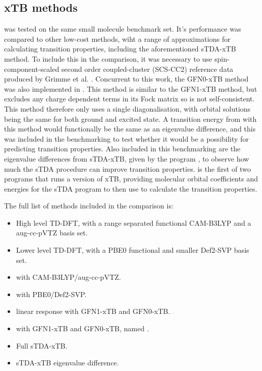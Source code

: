 \subsection{xTB methods}
\label{subsec:dscf_gfn_tests}
\dxtb was tested on the same small molecule benchmark set. It's performance was 
compared to other low-cost methods, wiht a range of approximations for calculating
transition properties, including the aforementioned sTDA-xTB method. To include 
this in the comparison, it was necessary to use spin-component-scaled second
order coupled-cluster (SCS-CC2) \cite{Hattig2000, Hellweg2008} reference data produced
by Grimme et al. \cite{Grimme}.
Concurrent to this work, the GFN0-xTB method was also implemented in .
This method is similar to the GFN1-xTB method, but excludes any charge dependent
terms in its Fock matrix so is not self-consistent. This method therefore only
uses a single diagonalisation, with orbital solutions being the same for both
ground and excited state. A transition energy from \dscf with this method would
functionally be the same as an eigenvalue difference, and this was included in 
the benchmarking to test whether it would be a possibility for predicting transition
properties.
Also included in this benchmarking are the eigenvalue differences from
sTDA-xTB, given by the  program \cite{Grimme2016}, to observe how
much the sTDA procedure can improve transition properties.  is the 
first of two programs that runs a version of xTB, providing molecular orbital
coefficients and energies for the sTDA program to then use to calculate the transition
properties.

The full list of methods included in the comparison is:
\begin{itemize}
    \item High level TD-DFT, with a range separated functional CAM-B3LYP and
     a aug-cc-pVTZ basis set.
    \item Lower level TD-DFT, with a PBE0 functional and smaller Def2-SVP basis set.
    \item \dscf with CAM-B3LYP/aug-cc-pVTZ.
    \item \dscf with PBE0/Def2-SVP.
    \item linear response with GFN1-xTB and GFN0-xTB.
    \item \dscf with GFN1-xTB and GFN0-xTB, named \dxtb.
    \item Full sTDA-xTB.
    \item sTDA-xTB eigenvalue difference.
\end{itemize}

